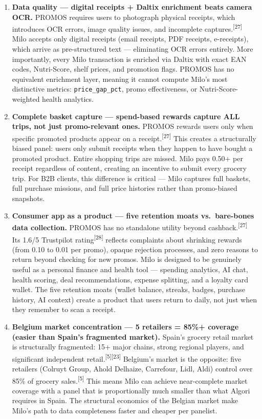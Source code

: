 \documentclass[11pt,a4paper]{article}
\begin{document}
\begin{enumerate}[leftmargin=1.5em, itemsep=6pt]

  \item \textbf{Data quality --- digital receipts + Daltix enrichment beats camera OCR.}
  PROMOS requires users to photograph physical receipts, which introduces OCR errors, image quality issues, and incomplete captures.\textsuperscript{[27]} Milo accepts only digital receipts (email receipts, PDF receipts, e-receipts), which arrive as pre-structured text --- eliminating OCR errors entirely. More importantly, every Milo transaction is enriched via Daltix with exact EAN codes, Nutri-Score, shelf prices, and promotion flags. PROMOS has no equivalent enrichment layer, meaning it cannot compute Milo's most distinctive metrics: \texttt{price\_gap\_pct}, promo effectiveness, or Nutri-Score-weighted health analytics.

  \item \textbf{Complete basket capture --- spend-based rewards capture ALL trips, not just promo-relevant ones.}
  PROMOS rewards users only when specific promoted products appear on a receipt.\textsuperscript{[27]} This creates a structurally biased panel: users only submit receipts when they happen to have bought a promoted product. Entire shopping trips are missed. Milo pays \texteuro{}0.50+ per receipt regardless of content, creating an incentive to submit every grocery trip. For B2B clients, this difference is critical --- Milo captures full baskets, full purchase missions, and full price histories rather than promo-biased snapshots.

  \item \textbf{Consumer app as a product --- five retention moats vs.\ bare-bones data collection.}
  PROMOS has no standalone utility beyond cashback.\textsuperscript{[27]} Its 1.6/5 Trustpilot rating\textsuperscript{[28]} reflects complaints about shrinking rewards (from \texteuro{}0.10 to \texteuro{}0.01 per promo), opaque rejection processes, and zero reasons to return beyond checking for new promos. Milo is designed to be genuinely useful as a personal finance and health tool --- spending analytics, AI chat, health scoring, deal recommendations, expense splitting, and a loyalty card wallet. The five retention moats (wallet balance, streaks, badges, purchase history, AI context) create a product that users return to daily, not just when they remember to scan a receipt.

  \item \textbf{Belgium market concentration --- 5 retailers = 85\%+ coverage (easier than Spain's fragmented market).}
  Spain's grocery retail market is structurally fragmented: 15+ major chains, strong regional players, and significant independent retail.\textsuperscript{[5][23]} Belgium's market is the opposite: five retailers (Colruyt Group, Ahold Delhaize, Carrefour, Lidl, Aldi) control over 85\% of grocery sales.\textsuperscript{[5]} This means Milo can achieve near-complete market coverage with a panel that is proportionally much smaller than what Algori requires in Spain. The structural economics of the Belgian market make Milo's path to data completeness faster and cheaper per panelist.


\end{enumerate}
\end{document}
